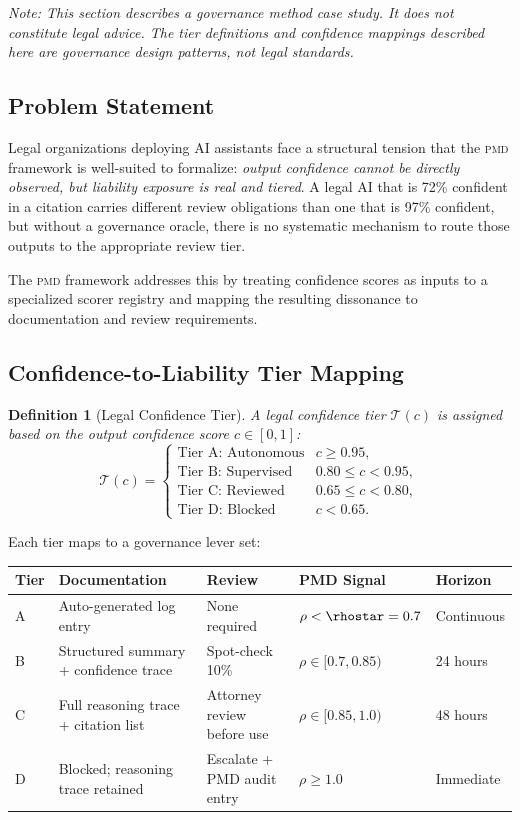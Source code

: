 \documentclass[11pt,letterpaper]{article}
\newtheorem{definition}[theorem]{Definition}
\theoremstyle{remark}
\newcommand{\pmd}{\textsc{pmd}}
\newcommand{\rhosys}{\rho}
\begin{document}
\textit{Note: This section describes a governance method case study.
It does not constitute legal advice.  The tier definitions and
confidence mappings described here are governance design patterns,
not legal standards.}

\subsection{Problem Statement}

Legal organizations deploying AI assistants face a structural tension
that the \pmd{} framework is well-suited to formalize: \emph{output
confidence cannot be directly observed, but liability exposure is
real and tiered}.  A legal AI that is 72\% confident in a citation
carries different review obligations than one that is 97\% confident,
but without a governance oracle, there is no systematic mechanism to
route those outputs to the appropriate review tier.

The \pmd{} framework addresses this by treating confidence scores as
inputs to a specialized scorer registry and mapping the resulting
dissonance to documentation and review requirements.

\subsection{Confidence-to-Liability Tier Mapping}

\begin{definition}[Legal Confidence Tier]
\label{def:legal-tier}
A \emph{legal confidence tier} $\mathcal{T}(c)$ is assigned based on the
output confidence score $c \in [0,1]$:
\[
  \mathcal{T}(c) = \begin{cases}
    \text{Tier A: Autonomous}   & c \geq 0.95, \\
    \text{Tier B: Supervised}   & 0.80 \leq c < 0.95, \\
    \text{Tier C: Reviewed}     & 0.65 \leq c < 0.80, \\
    \text{Tier D: Blocked}      & c < 0.65.
  \end{cases}
\]
\end{definition}

Each tier maps to a governance lever set:

\begin{center}
\begin{tabular}{p{1.5cm}p{2.6cm}p{2.6cm}p{3.4cm}p{1.8cm}}
\toprule
\textbf{Tier} & \textbf{Documentation} & \textbf{Review} &
\textbf{PMD Signal} & \textbf{Horizon} \\
\midrule
A & Auto-generated log entry & None required &
  $\rhosys < \rhostar = 0.7$ & Continuous \\
B & Structured summary + confidence trace &
  Spot-check 10\% &
  $\rhosys \in [0.7, 0.85)$ & 24 hours \\
C & Full reasoning trace + citation list &
  Attorney review before use &
  $\rhosys \in [0.85, 1.0)$ & 48 hours \\
D & Blocked; reasoning trace retained &
  Escalate + PMD audit entry &
  $\rhosys \geq 1.0$ & Immediate \\
\bottomrule
\end{tabular}
\end{center}
\end{document}
